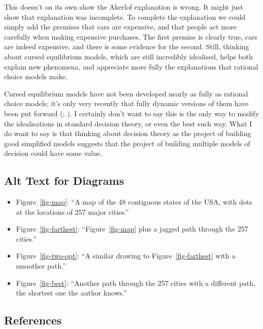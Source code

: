 \documentclass[
  12pt,
  letterpaper,
  DIV=11,
  numbers=noendperiod,
  twoside]{scrartcl}
\providecommand{\tightlist}{%
  \setlength{\itemsep}{0pt}\setlength{\parskip}{0pt}}
\begin{document}
This doesn't on its own show the Akerlof explanation is wrong. It might
just show that explanation was incomplete. To complete the explanation
we could simply add the premises that cars are expensive, and that
people act more carefully when making expensive purchases. The first
premise is clearly true, cars are indeed expensive, and there is some
evidence for the second. Still, thinking about cursed equilibrium
models, which are still incredibly idealised, helps both explain new
phenomena, and appreciate more fully the explanations that rational
choice models make.

Cursed equilibrium models have not been developed nearly as fully as
rational choice models; it's only very recently that fully dynamic
versions of them have been put forward (; ). I certainly don't want to say this is the only way to
modify the idealisations in standard decision theory, or even the best
such way. What I do want to say is that thinking about decision theory
as the project of building good simplified models suggests that the
project of building multiple models of decision could have some value.

\subsection*{Alt Text for Diagrams}\label{alt-text-for-diagrams}

\begin{itemize}
\tightlist
\item
  Figure~\ref{fig-map}: ``A map of the 48 contiguous states of the USA,
  with dots at the locations of 257 major cities.''
\item
  Figure~\ref{fig-farthest}: ``Figure~\ref{fig-map} plus a jagged path
  through the 257 cities.''
\item
  Figure~\ref{fig-two-opt}: ``A similar drawing to
  Figure~\ref{fig-farthest} with a smoother path.''
\item
  Figure~\ref{fig-best}: ``Another path through the 257 cities with a
  different path, the shortest one the author knows.''
\end{itemize}

\subsection*{References}\label{references}
\end{document}
